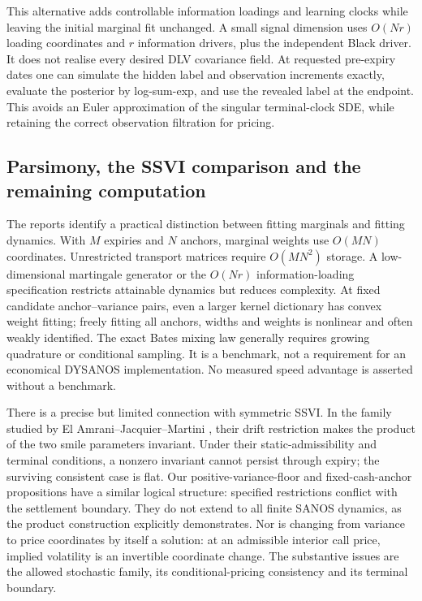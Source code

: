 \documentclass[11pt,a4paper]{article}
\numberwithin{equation}{section}
\theoremstyle{definition}\newtheorem{definition}[theorem]{Definition}
\theoremstyle{remark}\newtheorem{remark}[theorem]{Remark}
\begin{document}
This alternative adds controllable information loadings and learning clocks while leaving the initial marginal fit unchanged. A small signal dimension uses $O(Nr)$ loading coordinates and $r$ information drivers, plus the independent Black driver. It does not realise every desired DLV covariance field. At requested pre-expiry dates one can simulate the hidden label and observation increments exactly, evaluate the posterior by log-sum-exp, and use the revealed label at the endpoint. This avoids an Euler approximation of the singular terminal-clock SDE, while retaining the correct observation filtration for pricing.

\subsection{Parsimony, the SSVI comparison and the remaining computation}
The reports identify a practical distinction between fitting marginals and fitting dynamics. With $M$ expiries and $N$ anchors, marginal weights use $O(MN)$ coordinates. Unrestricted transport matrices require $O(MN^2)$ storage. A low-dimensional martingale generator or the $O(Nr)$ information-loading specification restricts attainable dynamics but reduces complexity. At fixed candidate anchor--variance pairs, even a larger kernel dictionary has convex weight fitting; freely fitting all anchors, widths and weights is nonlinear and often weakly identified. The exact Bates mixing law generally requires growing quadrature or conditional sampling. It is a benchmark, not a requirement for an economical DYSANOS implementation. No measured speed advantage is asserted without a benchmark.

There is a precise but limited connection with symmetric SSVI. In the family studied by El Amrani--Jacquier--Martini \cite{SSVI}, their drift restriction makes the product of the two smile parameters invariant. Under their static-admissibility and terminal conditions, a nonzero invariant cannot persist through expiry; the surviving consistent case is flat. Our positive-variance-floor and fixed-cash-anchor propositions have a similar logical structure: specified restrictions conflict with the settlement boundary. They do not extend to all finite SANOS dynamics, as the product construction explicitly demonstrates. Nor is changing from variance to price coordinates by itself a solution: at an admissible interior call price, implied volatility is an invertible coordinate change. The substantive issues are the allowed stochastic family, its conditional-pricing consistency and its terminal boundary.
\end{document}
